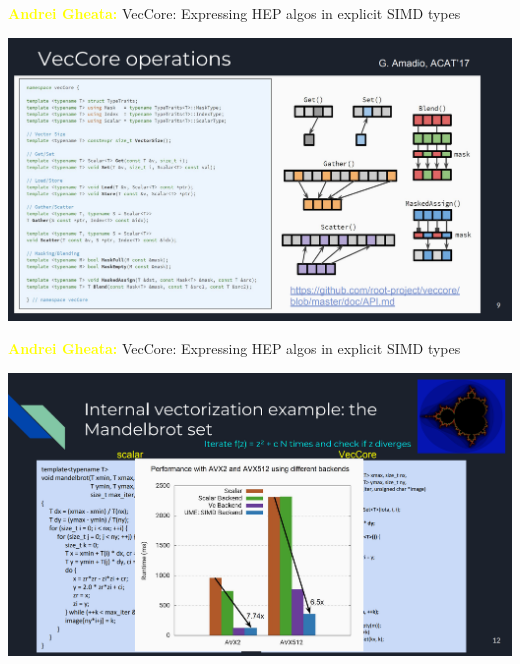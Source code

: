 \documentclass[aspectratio=169]{beamer}
\begin{document}
\begin{frame}{\textcolor{yellow}{\bf Andrei Gheata:} VecCore: Expressing HEP algos in explicit SIMD types}
\vspace{0.13 cm}
\begin{center}
\includegraphics[width=0.95\linewidth]{veccore-2.png}
\end{center}
\end{frame}

\begin{frame}{\textcolor{yellow}{\bf Andrei Gheata:} VecCore: Expressing HEP algos in explicit SIMD types}
\vspace{0.13 cm}
\begin{center}
\includegraphics[width=0.95\linewidth]{veccore-3.png}
\end{center}
\end{frame}
\end{document}
